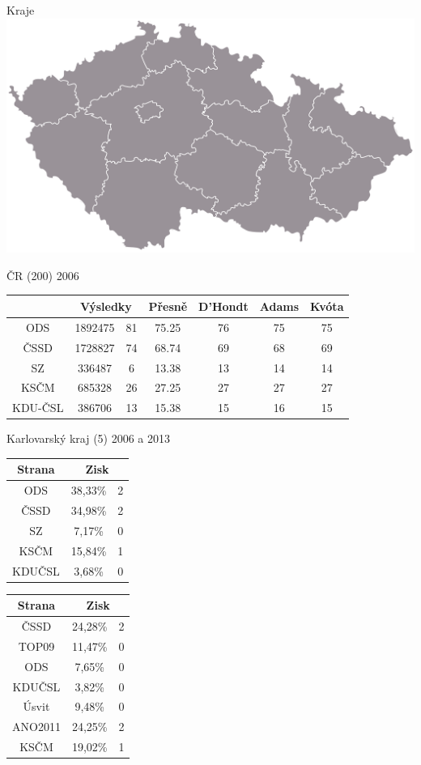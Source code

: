 \documentclass[17pt]{beamer}
\begin{document}
\begin{frame}{Kraje}
\includegraphics[scale=0.1]{zdroje/kraje.png}
\end{frame}

\begin{frame}{ČR (200) 2006}
\footnotesize
\begin{tabular}{|c|c|c|c|c|c|c|} \hline
 & \multicolumn{2}{c|}{Výsledky} & Přesně & D'Hondt & Adams & Kvóta\\
\hline ODS & 1892475 & 81 & 75.25 & 76 & 75 & 75\\
\hline ČSSD & 1728827 & 74 & 68.74 & 69 & 68 & 69\\
\hline SZ & 336487 & 6 & 13.38 & 13 & 14 & 14 \\
\hline KSČM & 685328 & 26 & 27.25 & 27 & 27 & 27 \\
\hline KDU-ČSL & 386706 & 13 & 15.38 & 15 & 16 & 15 \\
\hline
\end{tabular}
\end{frame}

\begin{frame}{Karlovarský kraj (5) 2006 a 2013}
\begin{center}
\begin{tabular}{|c|c|c|}
\hline
Strana  & \multicolumn{2}{c|}{Zisk}   \\ \hline
ODS     & 38,33\% & 2 \\ \hline
ČSSD    & 34,98\% & 2 \\ \hline
SZ      & 7,17\% & 0 \\ \hline
KSČM    & 15,84\% & 1 \\ \hline
KDUČSL & 3,68\% & 0  \\ \hline
\end{tabular}
\begin{tabular}{|c|c|c|}
\hline
Strana  & \multicolumn{2}{c|}{Zisk}     \\ \hline
ČSSD    & 24,28\% & 2 \\ \hline
TOP09   & 11,47\% & 0 \\ \hline
ODS     & 7,65\% & 0  \\ \hline
KDUČSL & 3,82\% & 0 \\ \hline
Úsvit   & 9,48\% & 0 \\ \hline
ANO2011 & 24,25\% & 2 \\ \hline
KSČM    & 19,02\% & 1 \\ \hline
\end{tabular}
\end{center}
\end{frame}
\end{document}
